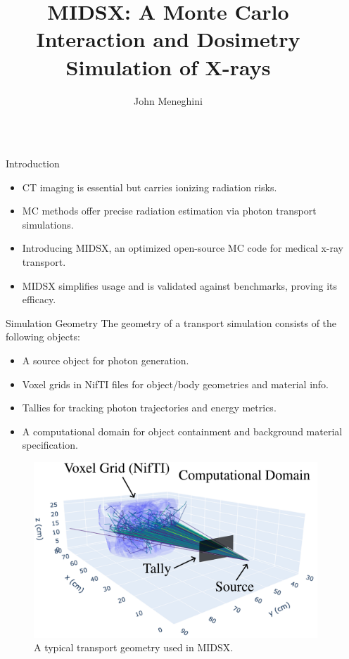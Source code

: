\documentclass[final]{beamer}
\title{\fontsize{80pt}{16pt}\selectfont MIDSX: A Monte Carlo Interaction and Dosimetry Simulation of X-rays}
\author{John Meneghini}
\institute[shortinst]{Department of Physics, Saint Vincent College, Latrobe, PA 15650}
\newlength{\sepwidth}
\newlength{\colwidth}
\newcommand{\separatorcolumn}{\begin{column}{\sepwidth}\end{column}}
\begin{document}
\begin{frame}[t]
\begin{columns}[t]
\separatorcolumn

\begin{column}{\colwidth}

  \begin{block}{Introduction}
    \begin{itemize}
        \item CT imaging is essential but carries ionizing radiation risks.
        \item MC methods offer precise radiation estimation via photon transport simulations.
        \item Introducing MIDSX, an optimized open-source MC code for medical x-ray transport.
        \item MIDSX simplifies usage and is validated against benchmarks, proving its efficacy.
    \end{itemize}
    \vspace{-\baselineskip}
  \end{block}

  \begin{block}{Simulation Geometry}
    The geometry of a transport simulation consists of the following objects:
    \begin{itemize}
      \item A source object for photon generation.
      \item Voxel grids in NifTI files for object/body geometries and material info.
      \item Tallies for tracking photon trajectories and energy metrics.
      \item A computational domain for object containment and background material specification.
    \end{itemize}

    \begin{figure}
      \centering
      \includegraphics[width = 1\colwidth]{comp_domain.pdf}
      \caption{A typical transport geometry used in MIDSX.}
    \end{figure}
    \vspace{-\baselineskip}
  \end{block}


\end{column}
\end{columns}
\end{frame}
\end{document}
